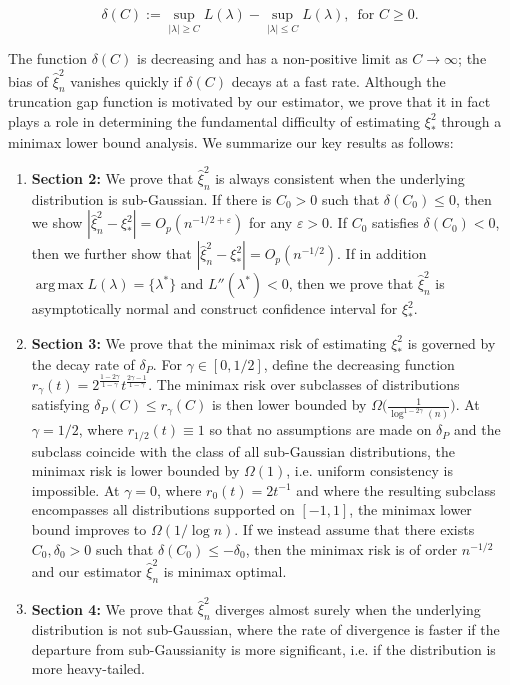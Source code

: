 \documentclass{article}
\theoremstyle{definition}
\newcommand*\eps{\epsilon}
\renewcommand*\epsilon{\varepsilon}
\newcommand{\1}{\mathbbm{1}}
\DeclareMathOperator*{\argmax}{arg\,max}
\begin{document}
\[
\delta(C) := \sup_{|\lambda| \geq C} L(\lambda) - \sup_{|\lambda| \leq C} L(\lambda), \, \text{ for $C \geq 0$.}
\]


The function $\delta(C)$ is decreasing and has a non-positive limit as $C \rightarrow \infty$; the bias of $\hat{\xi}^2_n$ vanishes quickly if $\delta(C)$ decays at a fast rate. Although the truncation gap function is motivated by our estimator, we prove that it in fact plays a role in determining the fundamental difficulty of estimating $\xi_*^2$ through a minimax lower bound analysis. We summarize our key results as follows:
\begin{enumerate}[leftmargin=4mm]
\item \textbf{Section 2:} We prove that $\hat{\xi}^2_n$ is always consistent when the underlying distribution is sub-Gaussian. If there is $C_0 > 0$ such that $\delta(C_0) \leq 0$, then we show $|\hat{\xi}^2_n - \xi^2_*| = O_p(n^{-1/2 + \eps})$ for any $\eps > 0$. If $C_0$ satisfies $\delta(C_0) < 0$, then we further show that $|\hat{\xi}^2_n - \xi^2_*| = O_p(n^{-1/2})$. If in addition $\argmax L(\lambda) = \{\lambda^*\}$ and $L''(\lambda^*) < 0$, then we prove that $\hat{\xi}^2_n$ is asymptotically normal and construct confidence interval for $\xi^2_*$. 
\item \textbf{Section 3:} We prove that the minimax risk of estimating $\xi^2_*$ is governed by the decay rate of $\delta_P$. For $\gamma \in [0, 1/2]$, define the decreasing function
$r_\gamma(t) = 2^{\frac{1-2\gamma}{1-\gamma}}t^{\frac{2\gamma-1}{1-\gamma}}$.
The minimax risk over subclasses of distributions satisfying $\delta_P(C) \leq r_\gamma(C)$ 
is then lower bounded by $\Omega\bigl(\frac{1}{\log^{1-2\gamma}(n)}\bigr)$. At $\gamma = 1/2$, where $r_{1/2}(t) \equiv 1$ so that no assumptions are made on $\delta_P$ and the subclass coincide with the class of all sub-Gaussian distributions, the minimax risk is lower bounded by $\Omega(1)$, i.e. uniform consistency is impossible. At $\gamma = 0$, where 
$r_0(t) = 2t^{-1}$ and where the resulting subclass encompasses all distributions supported on $[-1, 1]$, the minimax lower bound improves to $\Omega(1/\log n)$. If we instead assume that there exists $C_0, \delta_0 > 0$ such that $\delta(C_0) \leq - \delta_0$, then the minimax risk is of order $n^{-1/2}$ and our estimator $\hat{\xi}^2_n$ is minimax optimal. 
\item \textbf{Section 4:} We prove that $\hat \xi_n^2$ diverges almost surely when the underlying distribution is not sub-Gaussian, where the rate of divergence is faster if the departure from sub-Gaussianity is more significant, i.e. if the distribution is more heavy-tailed.  
\end{enumerate}
\end{document}
